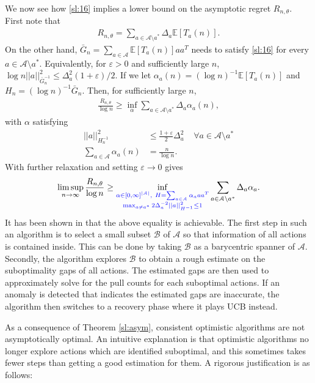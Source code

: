 \documentclass[10pt,a4article]{amsart}
\numberwithin{equation}{section}
\theoremstyle{plain}
\theoremstyle{definition}
\def\E{{\mathbb E}}
\def\e{{\varepsilon}}
\def\t{{\theta}}
\begin{document}
We now see how \eqref{sl:16} implies a lower bound on the asymptotic regret $R_{n,\t}$. First note that
\begin{align*}
R_{n, \t} = \sum_{a\in\mathcal A\setminus a^*}\Delta_a\E[T_a(n)].
\end{align*}
On the other hand, $\bar{G}_n = \sum_{a\in\mathcal A}\E[T_a(n)]aa^T$ needs to satisfy \eqref{sl:16} for every $a\in\mathcal A\setminus a^*$. Equivalently, for $\e>0$ and sufficiently large $n$, $\log n ||a||^2_{\bar{G}_n^{-1}}\leq\Delta_a^2(1+\e)/2$. If we let $\alpha_a(n) = (\log n)^{-1} \E[T_a(n)]$ and $H_n = (\log n)^{-1}\bar{G}_n$. Then, for sufficiently large $n$,
\begin{align*}
\frac{R_{n, \t}}{\log n} \geq\inf_{\alpha}\sum_{a\in\mathcal A\setminus a^*}\Delta_a\alpha_a(n),
\end{align*}
with $\alpha$ satisfying
\begin{align*}
||a||^2_{H_n^{-1}}&\leq \frac{1+\e}{2}\Delta_a^2\ \ \ \ \ \forall a\in\mathcal A\setminus a^*\\
\sum_{a\in\mathcal A}\alpha_a(n) &= \frac{n}{\log n}.  
\end{align*} 
With further relaxation and setting $\e\to 0$ gives
\begin{align*}
\limsup_{n\to\infty}\frac{R_{n,\t}}{\log n}\geq\inf_{\textcolor{blue}{\substack{\alpha\in [0,\infty]^{|\mathcal A|},\  H = \sum_{a\in\mathcal A}\alpha_a aa^T\\ \max_{a\neq a^*}2\Delta_a^{-2}||a||^2_{H^{-1}}\leq 1}}}\sum_{a\in\mathcal A\setminus a^*}\Delta_a\alpha_a. 
\end{align*}
It has been shown in \cite{lattimore2016end} that the above equality is achievable. The first step in such an algorithm is to select a small subset $\mathcal B$ of $\mathcal A$ so that information of all actions is contained inside. This can be done by taking  $\mathcal B$ as a barycentric spanner of $\mathcal A$. Secondly, the algorithm explores $\mathcal B$ to obtain a rough estimate on the suboptimality gaps of all actions. The estimated gaps are then used to approximately solve for the pull counts for each suboptimal actions. If an anomaly is detected that indicates the estimated gaps are inaccurate, the algorithm then switches to a recovery phase where it plays UCB instead. 

As a consequence of Theorem \ref{sl:asym}, consistent optimistic algorithms are not asymptotically optimal. An intuitive explanation is that optimistic algorithms no longer explore actions which are identified suboptimal, and this sometimes takes fewer steps than getting a good estimation for them. A rigorous justification is as follows:
\end{document}
